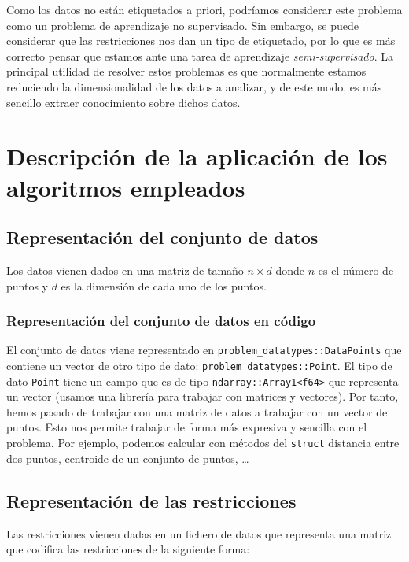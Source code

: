 \documentclass[11pt]{article}
\begin{document}
Como los datos no están etiquetados a priori, podríamos considerar este problema como un problema de aprendizaje no supervisado. Sin embargo, se puede considerar que las restricciones nos dan un tipo de etiquetado, por lo que es más correcto pensar que estamos ante una tarea de aprendizaje \emph{semi-supervisado}. La principal utilidad de resolver estos problemas es que normalmente estamos reduciendo la dimensionalidad de los datos a analizar, y de este modo, es más sencillo extraer conocimiento sobre dichos datos.

\pagebreak

\section{Descripción de la aplicación de los algoritmos empleados}

\subsection{Representación del conjunto de datos}

Los datos vienen dados en una matriz de tamaño $n \times d$ donde $n$ es el número de puntos y $d$ es la dimensión de cada uno de los puntos.

\subsubsection{Representación del conjunto de datos en código}

El conjunto de datos viene representado en \lstinline{problem_datatypes::DataPoints} que contiene un vector de otro tipo de dato: \lstinline{problem_datatypes::Point}. El tipo de dato \lstinline{Point} tiene un campo que es de tipo \lstinline{ndarray::Array1<f64>} que representa un vector (usamos una librería para trabajar con matrices y vectores). Por tanto, hemos pasado de trabajar con una matriz de datos a trabajar con un vector de puntos. Esto nos permite trabajar de forma más expresiva y sencilla con el problema. Por ejemplo, podemos calcular con métodos del \lstinline{struct} distancia entre dos puntos, centroide de un conjunto de puntos, \ldots

\subsection{Representación de las restricciones}

Las restricciones vienen dadas en un fichero de datos que representa una matriz que codifica las restricciones de la siguiente forma:
\end{document}
